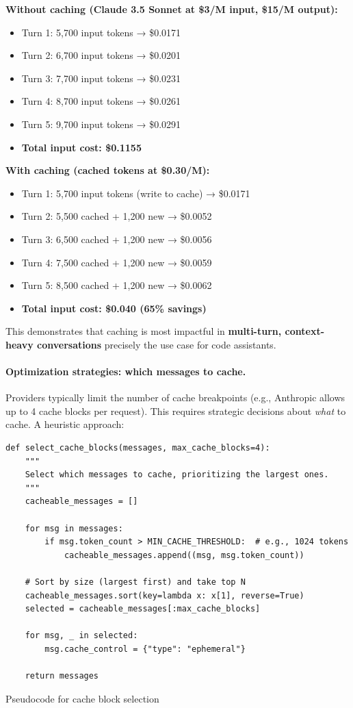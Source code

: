 \documentclass[english]{article}
\begin{document}
\textbf{Without caching (Claude 3.5 Sonnet at \$3/M input, \$15/M output):}
\begin{itemize}
    \item Turn 1: 5,700 input tokens → \$0.0171
    \item Turn 2: 6,700 input tokens → \$0.0201
    \item Turn 3: 7,700 input tokens → \$0.0231
    \item Turn 4: 8,700 input tokens → \$0.0261
    \item Turn 5: 9,700 input tokens → \$0.0291
    \item \textbf{Total input cost: \$0.1155}
\end{itemize}

\textbf{With caching (cached tokens at \$0.30/M):}
\begin{itemize}
    \item Turn 1: 5,700 input tokens (write to cache) → \$0.0171
    \item Turn 2: 5,500 cached + 1,200 new → \$0.0052
    \item Turn 3: 6,500 cached + 1,200 new → \$0.0056
    \item Turn 4: 7,500 cached + 1,200 new → \$0.0059
    \item Turn 5: 8,500 cached + 1,200 new → \$0.0062
    \item \textbf{Total input cost: \$0.040 (65\% savings)}
\end{itemize}

This demonstrates that caching is most impactful in \textbf{multi-turn, context-heavy conversations} precisely the use case for code assistants.

\paragraph{Optimization strategies: which messages to cache.}

Providers typically limit the number of cache breakpoints (e.g., Anthropic allows up to 4 cache blocks per request). This requires strategic decisions about \emph{what} to cache. A heuristic approach:

\begin{listing}[H]
\begin{verbatim}
def select_cache_blocks(messages, max_cache_blocks=4):
    """
    Select which messages to cache, prioritizing the largest ones.
    """
    cacheable_messages = []

    for msg in messages:
        if msg.token_count > MIN_CACHE_THRESHOLD:  # e.g., 1024 tokens
            cacheable_messages.append((msg, msg.token_count))

    # Sort by size (largest first) and take top N
    cacheable_messages.sort(key=lambda x: x[1], reverse=True)
    selected = cacheable_messages[:max_cache_blocks]

    for msg, _ in selected:
        msg.cache_control = {"type": "ephemeral"}

    return messages
\end{verbatim}
\caption{Pseudocode for cache block selection}
\end{listing}
\end{document}
